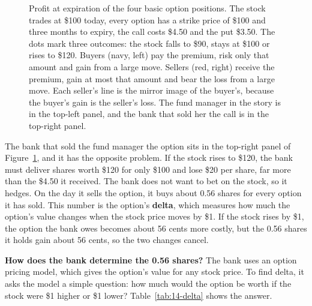 \begin{figure}[htbp]
\caption{Profit at expiration of the four basic option positions. The stock trades at \$100 today, every option has a strike price of \$100 and three months to expiry, the call costs \$4.50 and the put \$3.50. The dots mark three outcomes: the stock falls to \$90, stays at \$100 or rises to \$120. Buyers (navy, left) pay the premium, risk only that amount and gain from a large move. Sellers (red, right) receive the premium, gain at most that amount and bear the loss from a large move. Each seller's line is the mirror image of the buyer's, because the buyer's gain is the seller's loss. The fund manager in the story is in the top-left panel, and the bank that sold her the call is in the top-right panel.}
\label{fig:14-four-payoffs}
\end{figure}

The bank that sold the fund manager the option sits in the top-right panel of Figure~\ref{fig:14-four-payoffs}, and it has the opposite problem. If the stock rises to \$120, the bank must deliver shares worth \$120 for only \$100 and lose \$20 per share, far more than the \$4.50 it received. The bank does not want to bet on the stock, so it hedges. On the day it sells the option, it buys about 0.56 shares for every option it has sold. This number is the option's \textbf{delta}, which measures how much the option's value changes when the stock price moves by \$1. If the stock rises by \$1, the option the bank owes becomes about 56 cents more costly, but the 0.56 shares it holds gain about 56 cents, so the two changes cancel.

\textbf{How does the bank determine the 0.56 shares?} The bank uses an option pricing model, which gives the option's value for any stock price. To find delta, it asks the model a simple question: how much would the option be worth if the stock were \$1 higher or \$1 lower? Table~\ref{tab:14-delta} shows the answer.

